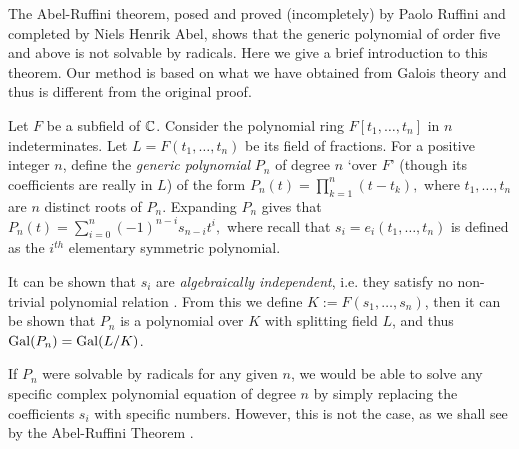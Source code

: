 The Abel-Ruffini theorem, posed and proved (incompletely) by Paolo Ruffini and completed by Niels Henrik Abel, shows that the generic polynomial of order five and above is not solvable by radicals. Here we give a brief introduction to this theorem. Our method is based on what we have obtained from Galois theory and thus is different from the original proof. 

\begin{definition}
	Let $F$ be a subfield of $\mathbb C$. Consider the polynomial ring $F[t_1, \dots, t_n]$ in $n$ indeterminates. Let $L = F(t_1, \dots, t_n)$ be its field of fractions. For a positive integer $n$, define the \textit{generic polynomial} $P_n$ of degree $n$ `over $F$' (though its coefficients are really in $L$) of the form
	$
	P_n(t) = \prod_{k=1}^{n} (t - t_k),
	$
	where $t_1, \dots, t_n $ are $n$ distinct roots of $P_n$. Expanding $P_n$ gives that 
	$
	P_n(t) = \sum_{i=0}^{n} (-1)^{n - i} s_{n-i} t^i,
	$
	where recall that $s_{i} = e_i(t_1,\dots,t_n)$ is defined as the $i^{th}$ elementary symmetric polynomial.
\end{definition}

It can be shown that $s_{i}$ are \textit{algebraically independent}, i.e. they satisfy no non-trivial polynomial relation \cite[p.~112]{Stewart}. From this we define $K := F(s_1, \dots, s_n)$, then it can be shown that $P_n$ is a polynomial over $K$ with splitting field $L$, and thus $\operatorname{Gal}(P_n) = \operatorname{Gal}(L/K)$. 

If $P_n$ were solvable by radicals for any given $n$, we would be able to solve any specific complex polynomial equation of degree $n$ by simply replacing the coefficients $s_i$ with specific numbers. However, this is not the case, as we shall see by the Abel-Ruffini Theorem \cite{galois-lecture-polynomials, commutative-algebra-uon, Abel-Ruffini}.




%
%


